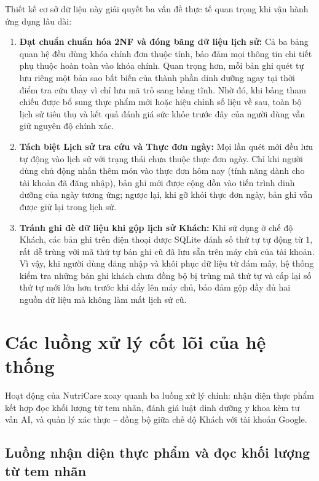 Thiết kế cơ sở dữ liệu này giải quyết ba vấn đề thực tế quan trọng khi vận hành ứng dụng lâu dài:
\begin{enumerate}[leftmargin=0.8cm, itemsep=2.5pt, topsep=2pt]
    \item \textbf{Đạt chuẩn chuẩn hóa 2NF và đóng băng dữ liệu lịch sử:} Cả ba bảng quan hệ đều dùng khóa chính đơn thuộc tính, bảo đảm mọi thông tin chi tiết phụ thuộc hoàn toàn vào khóa chính. Quan trọng hơn, mỗi bản ghi quét tự lưu riêng một bản sao bất biến của thành phần dinh dưỡng ngay tại thời điểm tra cứu thay vì chỉ lưu mã trỏ sang bảng tĩnh. Nhờ đó, khi bảng tham chiếu được bổ sung thực phẩm mới hoặc hiệu chỉnh số liệu về sau, toàn bộ lịch sử tiêu thụ và kết quả đánh giá sức khỏe trước đây của người dùng vẫn giữ nguyên độ chính xác.
    \item \textbf{Tách biệt Lịch sử tra cứu và Thực đơn ngày:} Mọi lần quét mới đều lưu tự động vào lịch sử với trạng thái chưa thuộc thực đơn ngày. Chỉ khi người dùng chủ động nhấn thêm món vào thực đơn hôm nay (tính năng dành cho tài khoản đã đăng nhập), bản ghi mới được cộng dồn vào tiến trình dinh dưỡng của ngày tương ứng; ngược lại, khi gỡ khỏi thực đơn ngày, bản ghi vẫn được giữ lại trong lịch sử.
    \item \textbf{Tránh ghi đè dữ liệu khi gộp lịch sử Khách:} Khi sử dụng ở chế độ Khách, các bản ghi trên điện thoại được SQLite đánh số thứ tự tự động từ $1$, rất dễ trùng với mã thứ tự bản ghi cũ đã lưu sẵn trên máy chủ của tài khoản. Vì vậy, khi người dùng đăng nhập và khôi phục dữ liệu từ đám mây, hệ thống kiểm tra những bản ghi khách chưa đồng bộ bị trùng mã thứ tự và cấp lại số thứ tự mới lớn hơn trước khi đẩy lên máy chủ, bảo đảm gộp đầy đủ hai nguồn dữ liệu mà không làm mất lịch sử cũ.
\end{enumerate}

\section{Các luồng xử lý cốt lõi của hệ thống}
\label{sec:core-pipelines}

Hoạt động của NutriCare xoay quanh ba luồng xử lý chính: nhận diện thực phẩm kết hợp đọc khối lượng từ tem nhãn, đánh giá luật dinh dưỡng y khoa kèm tư vấn AI, và quản lý xác thực -- đồng bộ giữa chế độ Khách với tài khoản Google.

\subsection{Luồng nhận diện thực phẩm và đọc khối lượng từ tem nhãn}
\label{subsec:multimodal-pipeline}

